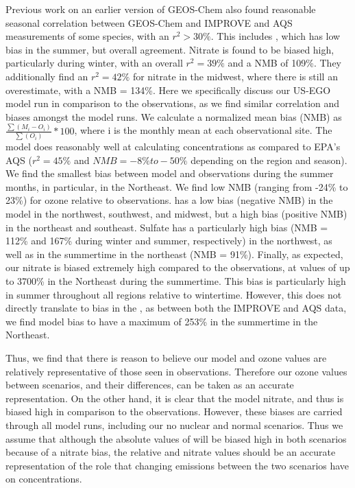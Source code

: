 \documentclass[12]{article}
\begin{document}
Previous work \citep{holt_changes_2015} on an earlier version of GEOS-Chem also found reasonable seasonal correlation between GEOS-Chem and IMPROVE and AQS measurements of some species, with an $r^2 > 30\%$. This includes , which has low bias in the summer, but overall agreement. Nitrate is found to be biased high, particularly during winter, with an overall $r^2 = 39\%$ and a NMB of 109\%. They additionally find an $r^2 = 42\%$ for nitrate in the midwest, where there is still an overestimate, with a NMB = 134\%. Here we specifically discuss our US-EGO model run in comparison to the observations, as we find similar correlation and biases amongst the model runs. We calculate a normalized mean bias (NMB) as $\frac{\sum(M_i - O_i)}{\sum(O_i)}*100$, where i is the monthly mean at each observational site. The model does reasonably well at calculating  concentrations as compared to EPA's AQS ($r^2 = 45\%$ and $NMB = -8\% to -50\%$ depending on the region and season). We find the smallest bias between model  and observations during the summer months, in particular, in the Northeast.
We find low NMB (ranging from -24\% to 23\%) for ozone relative to observations.  has a low bias (negative NMB) in the model in the northwest, southwest, and midwest, but a high bias (positive NMB) in the northeast and southeast. Sulfate has a particularly high bias (NMB = 112\% and 167\% during winter and summer, respectively) in the northwest, as well as in the summertime in the northeast (NMB = 91\%). Finally, as expected, our nitrate is biased extremely high compared to the observations, at values of up to 3700\% in the Northeast during the summertime. This bias is particularly high in summer throughout all regions relative to wintertime. However, this does not directly translate to bias in the , as between both the IMPROVE and AQS data, we find model bias to have a maximum of 253\% in the summertime in the Northeast. 

Thus, we find that there is reason to believe our model  and ozone values are relatively representative of those seen in observations. Therefore our ozone values between scenarios, and their differences, can be taken as an accurate representation. On the other hand, it is clear that the model nitrate, and thus  is biased high in comparison to the observations. However, these biases are carried through all model runs, including our no nuclear and normal scenarios. Thus we assume that although the absolute values of  will be biased high in both scenarios because of a nitrate bias, the relative  and nitrate values should be an accurate representation of the role that changing emissions between the two scenarios have on  concentrations.
\end{document}
